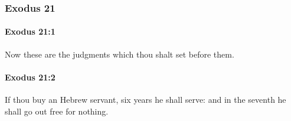 	\subsubsection{Exodus 21} %
		\label{EXODUS-21}

		\paragraph{Exodus 21:1} %
			\label{EXODUS-21-1}

			Now these are the judgments which thou shalt set before them.


		\paragraph{Exodus 21:2} %
			\label{EXODUS-21-2}

			If thou buy an Hebrew servant, six years he shall serve: and in the seventh he shall go out free for nothing.

